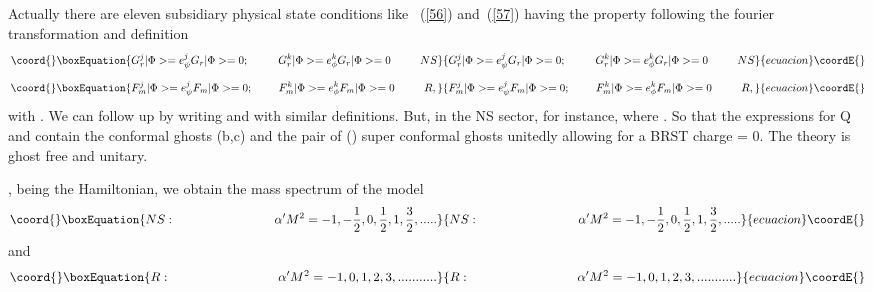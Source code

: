 \documentclass[a4paper,showpacs,preprintnumbers,amsmath,amssymb]{revtex4}
\begin{document}
Actually there are eleven subsidiary physical state conditions 
like  ~(\ref{56}) and~(\ref{57}) having the 
property following the fourier transformation and definition
\begin{equation}\coord{}\boxEquation{
G_r^j|\Phi> = e_{\psi}^j G_r |\Phi> = 0; ~~~~~~~~G_r^k|\Phi> = e_{\phi}^k G_r |\Phi> = 0 ~~~~~~~~NS
}{
G_r^j|\Phi> = e_{\psi}^j G_r |\Phi> = 0; ~~~~~~~~G_r^k|\Phi> = e_{\phi}^k G_r |\Phi> = 0 ~~~~~~~~NS
}{ecuacion}\coordE{}\end{equation}
\begin{equation}\coord{}\boxEquation{
F_m^j|\Phi> = e_{\psi}^j F_m |\Phi> = 0; ~~~~~~~ F_m^k|\Phi> = e_{\phi}^k F_m |\Phi> = 0 ~~~~~~~~R,
}{
F_m^j|\Phi> = e_{\psi}^j F_m |\Phi> = 0; ~~~~~~~ F_m^k|\Phi> = e_{\phi}^k F_m |\Phi> = 0 ~~~~~~~~R,
}{ecuacion}\coordE{}\end{equation} 
with \coordHE{}. We can follow up by writing \coordHE{} and  \coordHE{} with similar definitions. But, in the NS sector,
 for instance, \coordHE{} where
\coordHE{}. So that the expressions for Q
and \coordHE{}  contain the conformal ghosts (b,c) and the pair of (\myHighlight{$\beta ,\gamma$}\coordHE{}) super
conformal ghosts unitedly allowing for a BRST charge \coordHE{}= 0. The theory is ghost
free and unitary.

\coordHE{}, being the Hamiltonian, we obtain the mass spectrum of the model
\begin{equation}\coord{}\boxEquation{
NS:~~~~~~~~~~~~~~~~~~~~~~~~\alpha'M^2=-1,-\frac{1}{2},0,\frac{1}{2},1,\frac{3}{2},.....
}{
NS:~~~~~~~~~~~~~~~~~~~~~~~~\alpha'M^2=-1,-\frac{1}{2},0,\frac{1}{2},1,\frac{3}{2},.....
}{ecuacion}\coordE{}\end{equation}
and 
\begin{equation}\coord{}\boxEquation{
R:~~~~~~~~~~~~~~~~~~~~~~~~~\alpha'M^2=-1,0,1,2,3,...........
}{
R:~~~~~~~~~~~~~~~~~~~~~~~~~\alpha'M^2=-1,0,1,2,3,...........
}{ecuacion}\coordE{}\end{equation}
\end{document}
